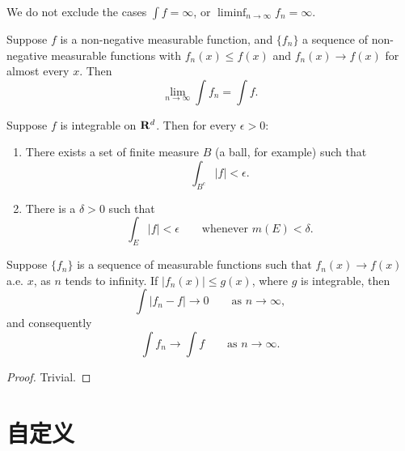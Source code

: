\begin{remark}
  We do not exclude the cases $\int f = \infty$,
  or $\liminf_{n \to \infty} f_n = \infty$.
\end{remark}

\begin{corollary}
  Suppose $f$ is a non-negative measurable function, and $\{f_n\}$ a sequence
  of non-negative measurable functions with
  $f_n(x) \le f(x)$ and $f_n(x) \to f(x)$ for almost every $x$. Then
  \begin{equation}
    \lim_{n \to \infty} \int f_n = \int f.
  \end{equation}
\end{corollary}

\begin{proposition}
  Suppose $f$ is integrable on $\mathbf{R}^d$. Then for every $\epsilon > 0$:
  \begin{enumerate}
    \renewcommand{\theenumi}{\roman{enumi}}
    \item There exists a set of finite measure $B$ (a ball, for example) such that
    \begin{equation}
      \int_{B^c} |f| < \epsilon.
    \end{equation}
    \item There is a $\delta > 0$ such that
    \begin{equation}
      \int_E |f| < \epsilon \qquad \text{whenever } m(E) < \delta.
    \end{equation}
  \end{enumerate}
\end{proposition}

\begin{theorem}
  Suppose $\{f_n\}$ is a sequence of measurable functions such that
  $f_n(x) \to f(x)$ a.e. $x$, as $n$ tends to infinity.
  If $|f_n(x)| \le g(x)$, where $g$ is integrable, then
  \begin{equation}
    \int |f_n - f| \to 0 \qquad \text{as } n \to \infty,
  \end{equation}
  and consequently
  \begin{equation}
    \int f_n \to \int f \qquad \text{as } n \to \infty.
  \end{equation}
\end{theorem}

\begin{proof}
  Trivial.
\end{proof}



\section{自定义}


